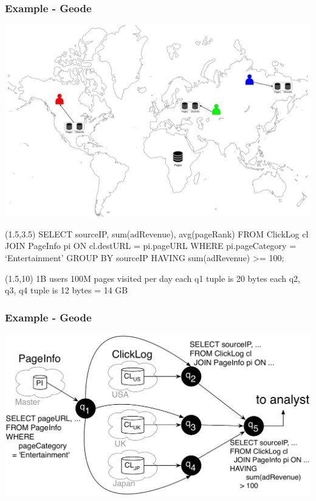 \documentclass{beamer}
\begin{document}
\begin{frame}
	\frametitle{Example - Geode}

	{\includegraphics[width=\textwidth]{./images/geode.png}}

	\begin{textblock}{11}(1.5,3.5)
		SELECT sourceIP, sum(adRevenue), avg(pageRank)
		\break
		FROM ClickLog cl
		\break
		JOIN PageInfo pi ON cl.destURL = pi.pageURL
		\break
		WHERE pi.pageCategory = `Entertainment'
		\break
		GROUP BY sourceIP
		\break
		HAVING sum(adRevenue) >= 100;
	\end{textblock}

	\begin{textblock}{7}(1.5,10)
		1B users
		\break
		100M pages visited per day
		\break
		each q1 tuple is 20 bytes
		\break
		each q2, q3, q4 tuple is 12 bytes
		\hline
		\vspace{4px}
		= 14 GB
	\end{textblock}
\end{frame}

\begin{frame}
	\frametitle{Example - Geode}

	\includegraphics[width=\textwidth]{./images/geode-execution-plan.png}
\end{frame}
\end{document}

